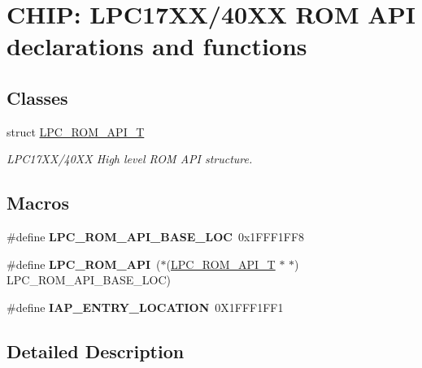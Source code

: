 \hypertarget{group___r_o_m_a_p_i__407_x__8_x}{\section{C\+H\+I\+P\+: L\+P\+C17\+X\+X/40\+X\+X R\+O\+M A\+P\+I declarations and functions}
\label{group___r_o_m_a_p_i__407_x__8_x}
}
\subsection*{Classes}
\begin{DoxyCompactItemize}
\item 
struct \hyperlink{struct_l_p_c___r_o_m___a_p_i___t}{L\+P\+C\+\_\+\+R\+O\+M\+\_\+\+A\+P\+I\+\_\+\+T}
\begin{DoxyCompactList}\small\item\em L\+P\+C17\+X\+X/40\+X\+X High level R\+O\+M A\+P\+I structure. \end{DoxyCompactList}\end{DoxyCompactItemize}
\subsection*{Macros}
\begin{DoxyCompactItemize}
\item 
\hypertarget{group___r_o_m_a_p_i__407_x__8_x_gafd3ca6cb0ad8c0c0b5be437a8387e51b}{\#define {\bfseries L\+P\+C\+\_\+\+R\+O\+M\+\_\+\+A\+P\+I\+\_\+\+B\+A\+S\+E\+\_\+\+L\+O\+C}~0x1\+F\+F\+F1\+F\+F8}\label{group___r_o_m_a_p_i__407_x__8_x_gafd3ca6cb0ad8c0c0b5be437a8387e51b}

\item 
\hypertarget{group___r_o_m_a_p_i__407_x__8_x_ga93f07fc38c09c20a7141e175ce599ef7}{\#define {\bfseries L\+P\+C\+\_\+\+R\+O\+M\+\_\+\+A\+P\+I}~($\ast$(\hyperlink{struct_l_p_c___r_o_m___a_p_i___t}{L\+P\+C\+\_\+\+R\+O\+M\+\_\+\+A\+P\+I\+\_\+\+T} $\ast$ $\ast$) L\+P\+C\+\_\+\+R\+O\+M\+\_\+\+A\+P\+I\+\_\+\+B\+A\+S\+E\+\_\+\+L\+O\+C)}\label{group___r_o_m_a_p_i__407_x__8_x_ga93f07fc38c09c20a7141e175ce599ef7}

\item 
\hypertarget{group___r_o_m_a_p_i__407_x__8_x_ga3d74da11ceb6b4ccf6d3730825406515}{\#define {\bfseries I\+A\+P\+\_\+\+E\+N\+T\+R\+Y\+\_\+\+L\+O\+C\+A\+T\+I\+O\+N}~0\+X1\+F\+F\+F1\+F\+F1}\label{group___r_o_m_a_p_i__407_x__8_x_ga3d74da11ceb6b4ccf6d3730825406515}

\end{DoxyCompactItemize}


\subsection{Detailed Description}
